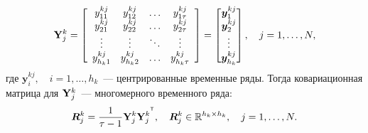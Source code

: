 \begin{equation*}
	\mathbf{Y}^k_j= \left[
\begin{array}{cccc}
y^{kj}_{11} & y^{kj}_{12} & \ldots & y^{kj}_{1\tau}\\
y^{kj}_{21} & y^{kj}_{22} & \ldots & y^{kj}_{2\tau}\\
\vdots & \vdots & \ddots & \vdots\\
y^{kj}_{h_k1} & y^{kj}_{h_k 2} & \ldots & y^{kj}_{h_k\tau}
\end{array}
\right]
	= \begin{bmatrix}
		\bm{y}^{kj}_1\\
            \bm{y}^{kj}_2\\
		\vdots\\
		\bm{y}^{kj}_{h_k}
		\end{bmatrix},\quad j = 1, \ldots, N,
	\end{equation*}
где $\bm{y}^{kj}_i, \quad i = 1, \ldots, h_k$~--- центрированные временные ряды.
Тогда ковариационная матрица для $\mathbf{Y}^k_j$~--- многомерного временного ряда:
$$ \bm{R}^k_j = \dfrac{1}{\tau-1}{\mathbf{Y}^k_j\mathbf{Y}^k_j}^{^{\text{\tiny\sffamily\upshape\mdseries T}}}, \quad \bm{R}^k_j \in \mathbb{R}^{h_k\times h_k}, \quad j = 1, \ldots, N.$$

